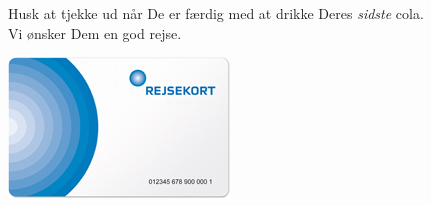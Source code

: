 \documentclass{article}
\begin{document}
\maketitle

\null

\vspace{-1cm}


\vspace{-0.8cm}

\Huge

\noindent Husk at tjekke ud når De er færdig med at drikke Deres \emph{sidste} cola.\\
Vi ønsker Dem en god rejse.

\vspace{0.3cm}

\centering\includegraphics[height=0.35\textheight]{rejsekort-flex.png}

\underskriv
\end{document}
